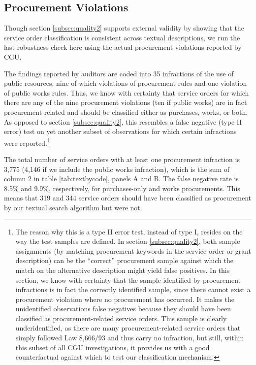 \documentclass[11pt]{article}
\begin{document}
\subsection{Procurement Violations}\label{subsec:quality3}

Though section \ref{subsec:quality2} supports external validity by showing that the service order classification is consistent across textual descriptions, we run the last robustness check here using the actual procurement violations reported by CGU.

The findings reported by auditors are coded into 35 infractions of the use of public resources, nine of which violations of procurement rules and one violation of public works rules. Thus, we know with certainty that service orders for which there are any of the nine procurement violations (ten if public works) are in fact procurement-related and should be classified either as purchases, works, or both. As opposed to section \ref{subsec:quality2}, this resembles a false negative (type II error) test on yet another subset of observations for which certain infractions were reported.\footnote{The reason why this is a type II error test, instead of type I, resides on the way the test samples are defined. In section \ref{subsec:quality2}, both sample assignments (by matching procurement keywords in the service order or grant description) can be the ``correct'' procurement sample against which the match on the alternative description might yield false positives. In this section, we know with certainty that the sample identified by procurement infractions is in fact the correctly identified sample, since there cannot exist a procurement violation where no procurement has occurred. It makes the unidentified observations false negatives because they should have been classified as procurement-related service orders. This sample is clearly underidentified, as there are many procurement-related service orders that simply followed Law 8,666/93 and thus carry no infraction, but still, within this subset of all CGU investigations, it provides us with a good counterfactual against which to test our classification mechanism.}


The total number of service orders with at least one procurement infraction is 3,775 (4,146 if we include the public works infraction), which is the sum of column 2 in table \ref{tab:textbycode}, panels A and B. The false negative rate is 8.5\% and 9.9\%, respectively, for purchases-only and works procurements. This means that 319 and 344 service orders should have been classified as procurement by our textual search algorithm but were not.
\end{document}
